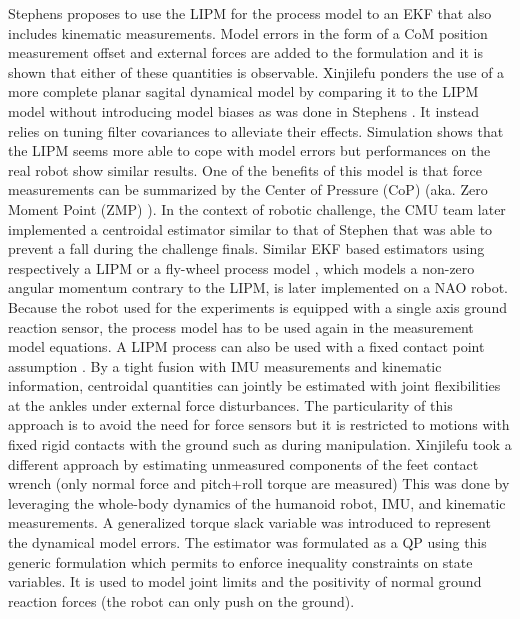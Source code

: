 Stephens \cite{stephens2011state} proposes to use the LIPM for the process model to an EKF 
that also includes kinematic measurements. Model errors in the form of a CoM position measurement 
offset and external forces are added to the formulation and it is shown that either of these quantities is observable. 
Xinjilefu \cite{xinjilefu2012state} ponders the use of a more complete planar sagital dynamical model by comparing it to the LIPM model
without introducing model biases as was done in Stephens \cite{stephens2011state}. It instead relies on tuning filter covariances to alleviate their effects. 
Simulation shows that the LIPM seems more able to cope with model errors but performances on the real robot show similar results. 
One of the benefits of this model is that force measurements can be summarized by the Center of Pressure (CoP) (aka. Zero Moment Point (ZMP) \cite{sardain2004forces}).
In the context of  robotic challenge, the CMU team later implemented a centroidal estimator \cite{xinjilefu2015center} similar to that of Stephen \cite{stephens2011state} that was able to prevent a fall during the challenge finals. 
Similar EKF based estimators using respectively a LIPM \cite{piperakis2016non} or a fly-wheel process model \cite{piperakis2018nonlinear}, which models a non-zero angular momentum contrary to the LIPM,  is later implemented on a NAO robot. 
Because the robot used for the experiments is equipped with a single axis ground reaction sensor,
the process model has to be used again in the measurement model equations.   
A LIPM process can also be used with a fixed contact point assumption \cite{benallegue2015estimation}. By a tight fusion with IMU 
measurements and kinematic information, centroidal quantities can jointly be estimated with joint flexibilities at the ankles under external force disturbances. 
The particularity of this approach is to avoid the need for force sensors but it is restricted to motions with fixed rigid contacts with the ground 
such as during manipulation.
Xinjilefu \cite{xinjilefu2014dynamic} took a different approach by estimating unmeasured components of the feet contact wrench (only normal force and pitch+roll torque are measured)
This was done by leveraging the whole-body dynamics of the humanoid robot, IMU, and kinematic measurements. 
A generalized torque slack variable was introduced to represent the dynamical model errors. %
The estimator was formulated as a QP using this generic formulation which permits to enforce inequality constraints on state variables. 
It is used to model joint limits and the positivity of normal ground reaction forces (the robot can only push on the ground).


